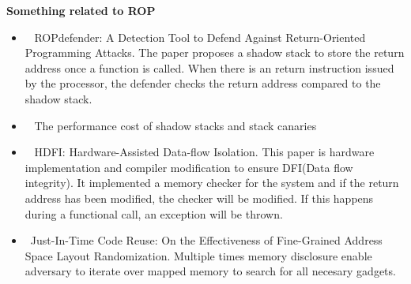 \documentclass[]{article}
\begin{document}
\textbf{Something related to ROP}
\begin{itemize}
	\item ~\cite{davi2011ropdefender} ROPdefender: A Detection Tool to Defend
Against Return-Oriented Programming Attacks. The paper proposes a shadow stack
to store the return address once a function is called. When there is an return
instruction issued by the processor, the defender checks the return address
compared to the shadow stack.
	\item ~\cite{dang2015performance} The performance cost of shadow stacks and
stack canaries	
	\item ~\cite{songhdfi} HDFI: Hardware-Assisted Data-flow Isolation. This
paper is hardware implementation and compiler modification to ensure DFI(Data
flow integrity). It implemented a memory checker for the system and if the
return address has been modified, the checker will be modified. If this happens
during a functional call, an exception will be thrown.
	\item ~\cite{snow2013just}Just-In-Time Code Reuse: On the Effectiveness of
Fine-Grained Address Space Layout Randomization. Multiple times memory
disclosure enable adversary to iterate over mapped memory to search for all
necesary gadgets.
\end{itemize}

{}

\end{document}

